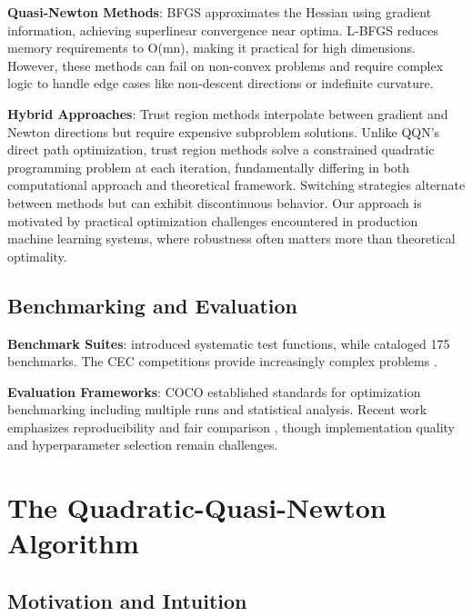 \textbf{Quasi-Newton Methods}: BFGS \citep{broyden1970convergence, fletcher1970new, goldfarb1970family, shanno1970conditioning} approximates the Hessian using gradient information, achieving superlinear convergence near optima.
L-BFGS \citep{liu1989limited} reduces memory requirements to O(mn), making it practical for high dimensions.
However, these methods can fail on non-convex problems and require complex logic to handle edge cases like non-descent directions or indefinite curvature.

\textbf{Hybrid Approaches}: Trust region methods \citep{more1983computing} interpolate between gradient and Newton directions but require expensive subproblem solutions.
Unlike QQN's direct path optimization, trust region methods solve a constrained quadratic programming problem at each iteration, fundamentally differing in both computational approach and theoretical framework.
Switching strategies \citep{morales2000automatic} alternate between methods but can exhibit discontinuous behavior.
Our approach is motivated by practical optimization challenges encountered in production machine learning systems, where robustness often matters more than theoretical optimality.

\hypertarget{benchmarking-and-evaluation}{%
\subsection{Benchmarking and Evaluation}\label{benchmarking-and-evaluation}}

\textbf{Benchmark Suites}: \citet{dejong1975analysis} introduced systematic test functions, while \citet{jamil2013literature} cataloged 175 benchmarks.
The CEC competitions provide increasingly complex problems \citep{liang2013problem}.

\textbf{Evaluation Frameworks}: COCO \citep{hansen2016coco} established standards for optimization benchmarking including multiple runs and statistical analysis.
Recent work emphasizes reproducibility \citep{beiranvand2017best} and fair comparison \citep{schmidt2021descending}, though implementation quality and hyperparameter selection remain challenges.

\hypertarget{the-quadratic-quasi-newton-algorithm}{%
\section{The Quadratic-Quasi-Newton Algorithm}\label{the-quadratic-quasi-newton-algorithm}}

\hypertarget{motivation-and-intuition}{%
\subsection{Motivation and Intuition}\label{motivation-and-intuition}}

